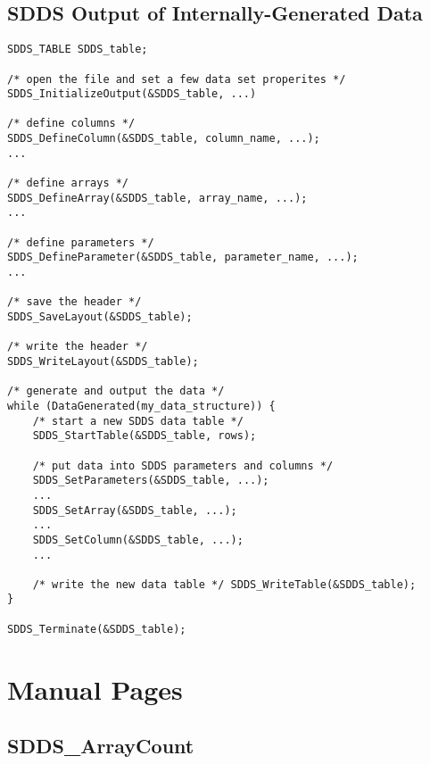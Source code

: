 \documentclass[11pt]{article}
\begin{document}
\subsection{SDDS Output of Internally-Generated Data}

\begin{verbatim}
SDDS_TABLE SDDS_table;

/* open the file and set a few data set properites */ 
SDDS_InitializeOutput(&SDDS_table, ...)

/* define columns */ 
SDDS_DefineColumn(&SDDS_table, column_name, ...); 
...

/* define arrays */ 
SDDS_DefineArray(&SDDS_table, array_name, ...);
...

/* define parameters */ 
SDDS_DefineParameter(&SDDS_table, parameter_name, ...); 
...

/* save the header */ 
SDDS_SaveLayout(&SDDS_table);

/* write the header */ 
SDDS_WriteLayout(&SDDS_table);

/* generate and output the data */ 
while (DataGenerated(my_data_structure)) { 
    /* start a new SDDS data table */ 
    SDDS_StartTable(&SDDS_table, rows);

    /* put data into SDDS parameters and columns */ 
    SDDS_SetParameters(&SDDS_table, ...); 
    ... 
    SDDS_SetArray(&SDDS_table, ...); 
    ... 
    SDDS_SetColumn(&SDDS_table, ...); 
    ...

    /* write the new data table */ SDDS_WriteTable(&SDDS_table);
}

SDDS_Terminate(&SDDS_table);
\end{verbatim}

\section{Manual Pages}
\label{ManualPages}
\subsection{SDDS\_ArrayCount}
\label{SDDS_ArrayCount}
\end{document}
